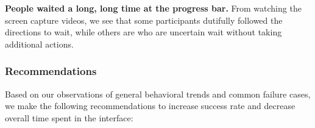 \documentclass[USenglish,oneside,twocolumn]{article}
\begin{document}
\begin{description}
\item {\bfseries People waited a long, long time at the progress bar.}
From watching the screen capture videos, we see that some participants dutifully followed the directions to wait, while others are who are uncertain wait without taking additional actions.
\end{description} 


\subsubsection{Recommendations}
\label{recommendations}
Based on our observations of general behavioral trends and common failure cases, we make the following recommendations to increase success rate and decrease overall time spent in the interface: \\
\end{document}
